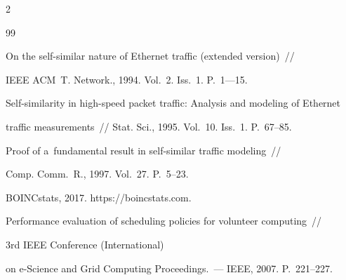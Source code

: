  \begin{multicols}{2}



\renewcommand{\bibname}{\protect\rmfamily Литература}




{\small\frenchspacing

{\baselineskip=10.5pt

\begin{thebibliography}{99}








On the self-similar nature of Ethernet traffic (extended version)~// 

IEEE ACM~T. Network., 1994. Vol.~2. Iss.~1. P.~1---15.



 Self-similarity in high-speed packet traffic: Analysis and modeling of Ethernet 

 traffic measurements~// Stat. Sci., 1995. Vol.~10. Iss.~1. P.~67--85.



Proof of a~fundamental result in self-similar traffic modeling~// 

Comp. Comm.~R., 1997. Vol.~27. P.~5--23.


 BOINCstats, 2017. {\sf https://boincstats.com}.





Performance evaluation of scheduling policies for volunteer computing~// 

3rd IEEE  Conference (International) 

on e-Science and Grid Computing Proceedings.~--- IEEE, 2007. P.~221--227.





\end{thebibliography}}}
\end{multicols}
